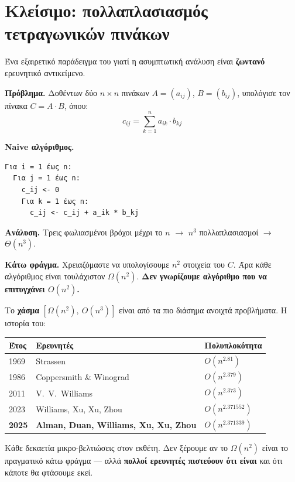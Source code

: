 \documentclass[11pt,a4paper]{article}
\begin{document}
\section{Κλείσιμο: πολλαπλασιασμός τετραγωνικών πινάκων}

Ένα εξαιρετικό παράδειγμα του γιατί η ασυμπτωτική ανάλυση είναι \textbf{ζωντανό}
ερευνητικό αντικείμενο.

\begin{examplebox}
\textbf{Πρόβλημα.} Δοθέντων δύο $n \times n$ πινάκων $A = (a_{ij})$,
$B = (b_{ij})$, υπολόγισε τον πίνακα $C = A \cdot B$, όπου:
\[
c_{ij} = \sum_{k=1}^n a_{ik} \cdot b_{kj}
\]

\textbf{Naive αλγόριθμος.}
\begin{codebox}
\begin{verbatim}
Για i = 1 έως n:
  Για j = 1 έως n:
    c_ij <- 0
    Για k = 1 έως n:
      c_ij <- c_ij + a_ik * b_kj
\end{verbatim}
\end{codebox}

\textbf{Ανάλυση.} Τρεις φωλιασμένοι βρόχοι μέχρι το $n$ $\to$ $n^3$
πολλαπλασιασμοί $\to$ $\Theta(n^3)$.

\textbf{Κάτω φράγμα.} Χρειαζόμαστε να υπολογίσουμε $n^2$ στοιχεία του $C$. Άρα
κάθε αλγόριθμος είναι τουλάχιστον $\Omega(n^2)$. \textbf{Δεν γνωρίζουμε αλγόριθμο
που να επιτυγχάνει $O(n^2)$.}
\end{examplebox}

Το \textbf{χάσμα} $[\Omega(n^2),\ O(n^3)]$ είναι από τα πιο διάσημα ανοιχτά
προβλήματα. Η ιστορία του:

\begin{center}
\begin{tabular}{@{}l l l@{}}
\toprule
Έτος & Ερευνητές & Πολυπλοκότητα \\
\midrule
1969     & Strassen                              & $O(n^{2.81})$ \\
1986     & Coppersmith \& Winograd               & $O(n^{2.379})$ \\
2011     & V.~V.~Williams                        & $O(n^{2.373})$ \\
2023     & Williams, Xu, Xu, Zhou                & $O(n^{2.371552})$ \\
\textbf{2025} & \textbf{Alman, Duan, Williams, Xu, Xu, Zhou} & $O(n^{2.371339})$ \\
\bottomrule
\end{tabular}
\end{center}

Κάθε δεκαετία μικρο-βελτιώσεις στον εκθέτη. Δεν ξέρουμε αν το $\Omega(n^2)$ είναι
το πραγματικό κάτω φράγμα --- αλλά \textbf{πολλοί ερευνητές πιστεύουν ότι είναι}
και ότι κάποτε θα φτάσουμε εκεί.
\end{document}
